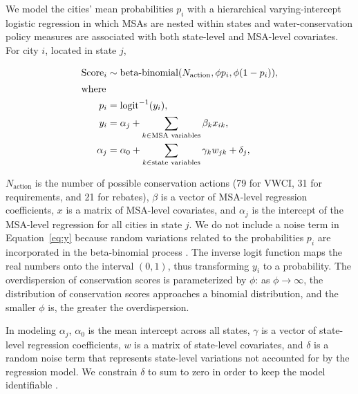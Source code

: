 \documentclass[draft,linenumbers]{agujournal}\usepackage{knitr}
\begin{document}
We model the cities' mean probabilities $p_i$
with a hierarchical varying-intercept logistic
regression in which MSAs are nested within states and
water-conservation policy measures
are associated with both
state-level and MSA-level covariates.
For city $i$, located in state $j$,
\begin{linenomath*}
\begin{align}
\text{Score}_i \sim{}& \text{beta-binomial}(N_{\text{action}}, \phi p_i, \phi (1 - p_i)), \\
\intertext{where}
p_i ={}& \text{logit}^{-1}(y_i),\\
y_i ={}& \alpha_{j} + \sum_{k \in \text{MSA variables}} \beta_k x_{ik}, \label{eq:y}\\
\alpha_{j} ={}&
\alpha_0  + \sum_{k \in \text{state variables}} \gamma_k w_{jk} + \delta_{j},
\end{align}
\end{linenomath*}
$N_{\text{action}}$ is the number of possible conservation actions
(79 for VWCI, 31 for requirements, and
21 for rebates),
$\beta$ is a vector of MSA-level regression coefficients,
$x$ is a matrix of MSA-level covariates,
and $\alpha_j$ is the intercept of the MSA-level regression
for all cities in state $j$.
We do not include a noise term in Equation~\ref{eq:y} because random variations
related to the probabilities $p_i$ are incorporated in the beta-binomial
process \citep[p.~321]{gelman:arm:2007}.
The inverse logit function maps the real numbers onto the interval $(0,1)$,
thus transforming $y_i$ to a probability.
The overdispersion of conservation scores is parameterized by $\phi$:
as $\phi \rightarrow \infty$, the distribution of conservation scores approaches
a binomial distribution, and the smaller $\phi$ is, the greater the
overdispersion.

In modeling $\alpha_j$,
$\alpha_0$ is the mean intercept across all states,
$\gamma$ is a vector of state-level regression coefficients,
$w$ is a matrix of state-level covariates,
and
$\delta$ is a random noise term that represents state-level variations not
accounted for by the regression model.
We constrain $\delta$ to sum to zero in order to keep the model identifiable
\citep[Ch.~23]{stan:manual:2015}.
\end{document}
